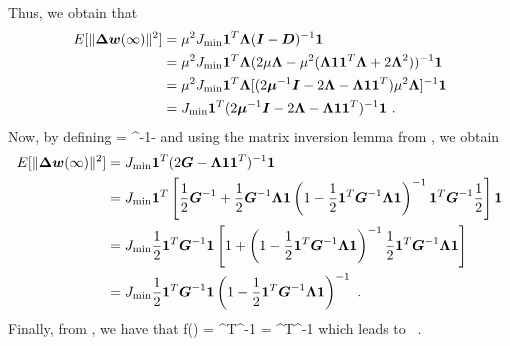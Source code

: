 \emath
Thus, we obtain that
\begin{align}
  E[\|\vect{\Delta w}(\infty)\|^2] &= \mu^2J_\textup{min}\vect{1}^T\vect{\Lambda}(\vect{I}-\vect{D})^{-1}\vect{1}\\
  &= \mu^2J_\textup{min}\vect{1}^T\vect{\Lambda}(2\mu\vect{\Lambda}-\mu^2(\vect{\Lambda}\vect{1}\vect{1}^T\vect{\Lambda}+2\vect{\Lambda}^2))^{-1}\vect{1}\\
  &= \mu^2J_\textup{min}\vect{1}^T\vect{\Lambda}[(2\vect{\mu}^{-1}\vect{I}-2\vect{\Lambda}-\vect{\Lambda}\vect{1}\vect{1}^T)\mu^2\vect{\Lambda}]^{-1}\vect{1}\\
  &= J_\textup{min}\vect{1}^T(2\vect{\mu}^{-1}\vect{I}-2\vect{\Lambda}-\vect{\Lambda}\vect{1}\vect{1}^T)^{-1}\vect{1}\ .
\end{align}
Now, by defining
\bmath
   = \vect{\mu}^{-1}-\vect{\Lambda}
\emath
and using the matrix inversion lemma from , we obtain
\begin{align}
  E[\|\vect{\Delta w}(\infty)\|^2] &= J_\textup{min}\vect{1}^T(2\vect{G}-\vect{\Lambda}\vect{1}\vect{1}^T)^{-1}\vect{1}\\
  &= J_\textup{min}\vect{1}^T\left[\frac{1}{2}\vect{G}^{-1}+\frac{1}{2}\vect{G}^{-1}\vect{\Lambda}\vect{1}\left(1-\frac{1}{2}\vect{1}^T\vect{G}^{-1}\vect{\Lambda}\vect{1}\right)^{-1}\vect{1}^T\vect{G}^{-1}\frac{1}{2}\right]\vect{1}\\
  &= J_\textup{min}\frac{1}{2}\vect{1}^T\vect{G}^{-1}\vect{1}\left[1+\left(1-\frac{1}{2}\vect{1}^T\vect{G}^{-1}\vect{\Lambda}\vect{1}\right)^{-1}\frac{1}{2}\vect{1}^T\vect{G}^{-1}\vect{\Lambda}\vect{1}\right]\\
  &= J_\textup{min}\frac{1}{2}\vect{1}^T\vect{G}^{-1}\vect{1}\left(1-\frac{1}{2}\vect{1}^T\vect{G}^{-1}\vect{\Lambda}\vect{1}\right)^{-1}\ .
\end{align}
Finally, from , we have that
\bmath
  f(\mu) = ^T\vect{\Lambda}^{-1} = ^T^{-1}\vect{\Lambda}
\emath
which leads to
\bmath
  \ .
\emath

